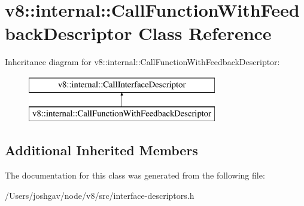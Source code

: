\hypertarget{classv8_1_1internal_1_1_call_function_with_feedback_descriptor}{}\section{v8\+:\+:internal\+:\+:Call\+Function\+With\+Feedback\+Descriptor Class Reference}
\label{classv8_1_1internal_1_1_call_function_with_feedback_descriptor}
Inheritance diagram for v8\+:\+:internal\+:\+:Call\+Function\+With\+Feedback\+Descriptor\+:\begin{figure}[H]
\begin{center}
\leavevmode
\includegraphics[height=2.000000cm]{classv8_1_1internal_1_1_call_function_with_feedback_descriptor}
\end{center}
\end{figure}
\subsection*{Additional Inherited Members}


The documentation for this class was generated from the following file\+:\begin{DoxyCompactItemize}
\item 
/\+Users/joshgav/node/v8/src/interface-\/descriptors.\+h\end{DoxyCompactItemize}
